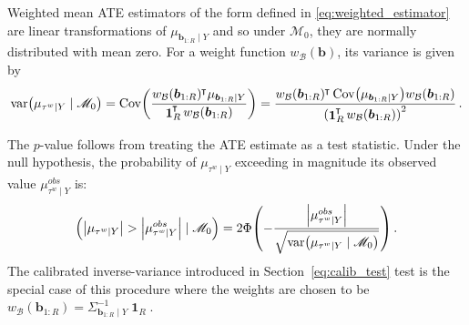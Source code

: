 \documentclass[letter,12pt]{article}
\DeclarePairedDelimiter{\parenthesis}{\lparen}{\rparen}
\DeclarePairedDelimiter{\absolutevalue}{\lvert}{\rvert}
\newcommand{\del}[1]{\parenthesis*{#1}}
\newcommand{\abs}[1]{\absolutevalue*{#1}}
\let\Pr\relax
\DeclareMathOperator{\Pr}{\mathbb{P}}
\DeclareMathOperator{\cov}{{Cov}}
\DeclareMathOperator{\var}{{var}}
\DeclareMathOperator{\ones}{\mathbf{1}}
\newcommand*{\trans}{^{\mkern-1.5mu\intercal}}
\newcommand{\border}{\mathcal{B}}
\newcommand{\sentinel}{\bm{b}}
\newcommand{\numsent}{R}
\newcommand{\sentinels}{\sentinel_{1:\numsent}}
\newcommand{\tauw}{\tau^{w}}
\newcommand{\modnull}{\mathscr{M}_0}
\newcommand{\weightb}{w_{\border}}
\begin{document}
Weighted mean ATE estimators of the form defined in \eqref{eq:weighted_estimator} are linear transformations of \(\mu_{\sentinels \mid Y}\) and so under \(\modnull\), they are normally distributed with mean zero.
For a weight function \(\weightb(\sentinel)\), its variance is given by
\begin{equation}
        \var\del{\mu_{\tauw \mid Y} \mid \modnull} = \cov\del{ \frac{\weightb(\sentinels)\trans \mu_{\sentinels \mid Y}}{\ones_{\numsent}\trans \weightb(\sentinels)}}
        = \frac{\weightb(\sentinels) \trans \cov \del{\mu_{\sentinels \mid Y}} \weightb(\sentinels)}{\del{\ones_{\numsent}\trans \weightb(\sentinels)}^2}
        \,.
\end{equation}


The \(p\)-value follows from treating the ATE estimate as a test statistic.
Under the null hypothesis, the probability of \(\mu_{\tauw \mid Y}\) exceeding in magnitude its observed value \(\mu_{\tauw \mid Y}^{obs}\) is:
\begin{equation}
    \Pr\del{ \abs{\mu_{\tauw \mid Y}} > \abs{\mu_{\tauw \mid Y}^{obs}} \mid \modnull} = 2 \Phi\del{ -\frac{\abs{\mu_{\tauw \mid Y}^{obs}}}{\sqrt{\var\del{\mu_{\tauw \mid Y} \mid \modnull}}} }\,.
\end{equation}
The calibrated inverse-variance introduced in Section~\ref{eq:calib_test} test is the special case of this procedure where the weights are chosen to be \(\weightb(\sentinels) = \Sigma^{-1}_{\sentinels \mid Y} \ones_{\numsent}\).





\end{document}
